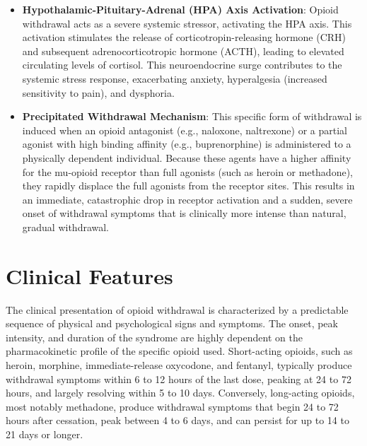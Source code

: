\begin{itemize}
    \item \textbf{Hypothalamic-Pituitary-Adrenal (HPA) Axis Activation}: Opioid withdrawal acts as a severe systemic stressor, activating the HPA axis. This activation stimulates the release of corticotropin-releasing hormone (CRH) and subsequent adrenocorticotropic hormone (ACTH), leading to elevated circulating levels of cortisol. This neuroendocrine surge contributes to the systemic stress response, exacerbating anxiety, hyperalgesia (increased sensitivity to pain), and dysphoria.
    \item \textbf{Precipitated Withdrawal Mechanism}: This specific form of withdrawal is induced when an opioid antagonist (e.g., naloxone, naltrexone) or a partial agonist with high binding affinity (e.g., buprenorphine) is administered to a physically dependent individual. Because these agents have a higher affinity for the mu-opioid receptor than full agonists (such as heroin or methadone), they rapidly displace the full agonists from the receptor sites. This results in an immediate, catastrophic drop in receptor activation and a sudden, severe onset of withdrawal symptoms that is clinically more intense than natural, gradual withdrawal.
\end{itemize}

\section*{Clinical Features}
The clinical presentation of opioid withdrawal is characterized by a predictable sequence of physical and psychological signs and symptoms. The onset, peak intensity, and duration of the syndrome are highly dependent on the pharmacokinetic profile of the specific opioid used. Short-acting opioids, such as heroin, morphine, immediate-release oxycodone, and fentanyl, typically produce withdrawal symptoms within 6 to 12 hours of the last dose, peaking at 24 to 72 hours, and largely resolving within 5 to 10 days. Conversely, long-acting opioids, most notably methadone, produce withdrawal symptoms that begin 24 to 72 hours after cessation, peak between 4 to 6 days, and can persist for up to 14 to 21 days or longer.

